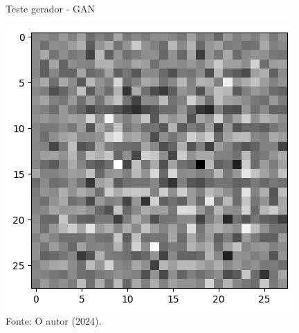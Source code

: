 \begin{figure}[H]
\centering
\caption{Teste gerador - GAN}
\includegraphics[width=.7\linewidth]{apendices/fig/9_IAA009_7.png}
\caption*{Fonte: O autor (2024).}
\end{figure}


